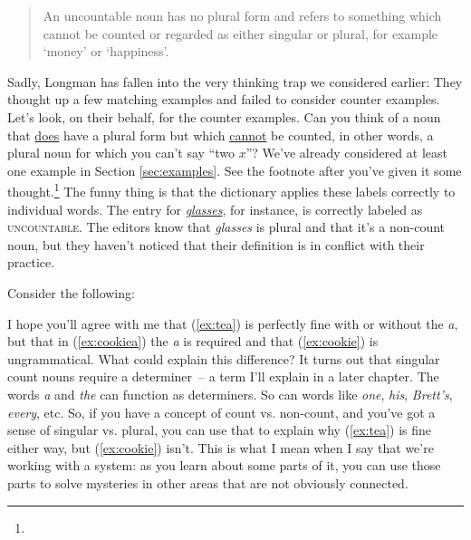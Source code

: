 \begin{quote}
    An uncountable noun has no plural form and refers to something which cannot be counted or regarded as either singular or plural, for example `money' or `happiness'.
\end{quote}
Sadly, Longman has fallen into the very thinking trap we considered earlier: They thought up a few matching examples and failed to consider counter examples. Let's look, on their behalf, for the counter examples. Can you think of a noun that \uline{does} have a plural form but which \uline{cannot} be counted, in other words, a plural noun for which you can't say ``two $x$''? We've already considered at least one example in Section \ref{sec:examples}. See the footnote after you've given it some thought.\footnote{
} The funny thing is that the dictionary applies these labels correctly to individual words. The entry for \href{https://www.ldoceonline.com/dictionary/glasses/}{\textit{glasses}}, for instance, is correctly labeled as \textsc{uncountable}. The editors know that \textit{glasses} is plural and that it's a non-count noun, but they haven't noticed that their definition is in conflict with their practice.



\begin{tcolorbox}[title=Why does this matter?, colback=white]
    Consider the following: 
    
    \ea
        \label{ex:tea}
        \label{ex:cookiea}
        \label{ex:cookie}
        \z\label{ex:blank}
    \z
    
    I hope you'll agree with me that (\ref{ex:tea}) is perfectly fine with or without the \textit{a}, but that in (\ref{ex:cookiea}) the \textit{a} is required and that (\ref{ex:cookie}) is ungrammatical. What could explain this difference? It turns out that singular count nouns require a determiner~-- a term I'll explain in a later chapter. The words \textit{a} and \textit{the} can function as determiners. So can words like \textit{one}, \textit{his}, \textit{Brett's}, \textit{every}, etc. So, if you have a concept of count vs. non-count, and you've got a sense of singular vs. plural, you can use that to explain why (\ref{ex:tea}) is fine either way, but (\ref{ex:cookie}) isn't. This is what I mean when I say that we're working with a system: as you learn about some parts of it, you can use those parts to solve mysteries in other areas that are not obviously connected.
\end{tcolorbox}

